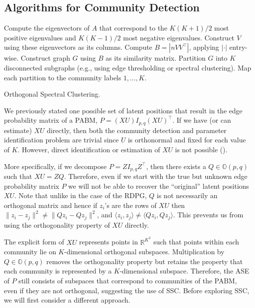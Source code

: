 \documentclass[12pt]{article}
\begin{document}
\hypertarget{community-detection}{%
\subsection{Algorithms for Community Detection}\label{community-detection}}

\begin{algorithm}[t]
  \label{alg:osc}
  \DontPrintSemicolon
  \SetAlgoLined
    Compute the eigenvectors of $A$ that correspond to the $K (K+1) / 2$ most
    positive eigenvalues and $K (K-1) / 2$ most negative eigenvalues. Construct
    $V$ using these eigenvectors as its columns.\;
    Compute $B = |n V V^\top|$, applying $|\cdot|$ entry-wise.\;
    Construct graph $G$ using $B$ as its similarity matrix.\;
    Partition $G$ into $K$ disconnected subgraphs
    (e.g., using edge thresholding or spectral clustering).\;
    Map each partition to the community labels $1, ..., K$.\;
  \caption{Orthogonal Spectral Clustering.}
\end{algorithm}

We previously stated one possible set of latent positions that result in
the edge probability matrix of a PABM, \(P = (XU) I_{p, q} (XU)^\top\). If
we have (or can estimate) \(XU\) directly, then both the community
detection and parameter identification problem are trivial since \(U\)
is orthonormal and fixed for each value of \(K\). However, direct
identification or estimation of \(XU\) is not possible
(\cite{rubindelanchy2017statistical}).

More specifically, if we decompose \(P = Z I_{p, q} Z^\top\), then
there exists a \(Q \in \mathbb{O}(p, q)\) such that \(XU = Z Q\). Therefore, even if we
start with the true but unknown edge probability matrix $P$ we
will not be able to recover the ``original'' latent positions \(XU\).
Note that unlike in the case of the RDPG, \(Q\) is not necessarily an
orthogonal matrix and hence if \(z_i\)'s
are the rows of \(XU\) then
\(\|z_i - z_j\|^2 \neq \|Q z_i - Q z_j\|^2\), and
\(\langle z_i, z_j \rangle \neq \langle Q z_i, Q z_j \rangle\). This
prevents us from using the orthogonality property of \(XU\) directly. 

The explicit form of \(XU\) represents points in \(\mathbb{R}^{K^2}\)
such that points within each community lie on \(K\)-dimensional
orthogonal subspaces. Multiplication by \(Q \in \mathbb{O}(p, q)\)
removes the orthogonality property but retains the property that each
community is represented by a \(K\)-dimensional subspace. Therefore, the
ASE of \(P\) still consists of subspaces 
that correspond to communities of the PABM, even if they are not orthogonal, 
suggesting the use of SSC. Before exploring SSC, we will first consider
a different approach.
\end{document}
